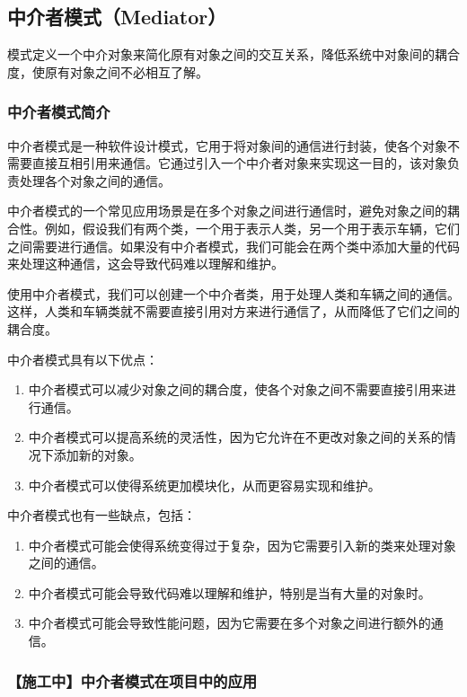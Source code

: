 \subsection{中介者模式（Mediator）}

模式定义一个中介对象来简化原有对象之间的交互关系，降低系统中对象间的耦合度，使原有对象之间不必相互了解。

\subsubsection{中介者模式简介}

中介者模式是一种软件设计模式，它用于将对象间的通信进行封装，使各个对象不需要直接互相引用来通信。它通过引入一个中介者对象来实现这一目的，该对象负责处理各个对象之间的通信。

中介者模式的一个常见应用场景是在多个对象之间进行通信时，避免对象之间的耦合性。例如，假设我们有两个类，一个用于表示人类，另一个用于表示车辆，它们之间需要进行通信。如果没有中介者模式，我们可能会在两个类中添加大量的代码来处理这种通信，这会导致代码难以理解和维护。

使用中介者模式，我们可以创建一个中介者类，用于处理人类和车辆之间的通信。这样，人类和车辆类就不需要直接引用对方来进行通信了，从而降低了它们之间的耦合度。

中介者模式具有以下优点：
\begin{enumerate}
\item 中介者模式可以减少对象之间的耦合度，使各个对象之间不需要直接引用来进行通信。
\item 中介者模式可以提高系统的灵活性，因为它允许在不更改对象之间的关系的情况下添加新的对象。
\item 中介者模式可以使得系统更加模块化，从而更容易实现和维护。
\end{enumerate}

中介者模式也有一些缺点，包括：
\begin{enumerate}
\item 中介者模式可能会使得系统变得过于复杂，因为它需要引入新的类来处理对象之间的通信。
\item 中介者模式可能会导致代码难以理解和维护，特别是当有大量的对象时。
\item 中介者模式可能会导致性能问题，因为它需要在多个对象之间进行额外的通信。
\end{enumerate}

\subsubsection{【施工中】中介者模式在项目中的应用}